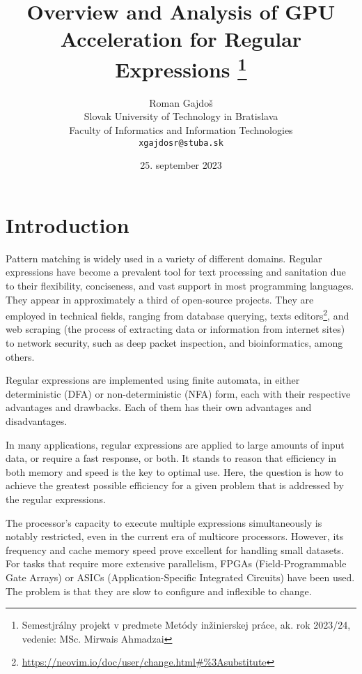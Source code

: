 \documentclass[10pt,onecolumn,twoside,english,a4paper]{article}
\title{Overview and Analysis of GPU Acceleration for Regular Expressions
\thanks{Semestjrálny projekt v predmete Metódy inžinierskej práce, ak. rok 2023/24, vedenie: MSc. Mirwais Ahmadzai}} %
\author{Roman Gajdoš\\[2pt]
	{\small Slovak University of Technology in Bratislava}\\
	{\small Faculty of Informatics and Information Technologies}\\
	{\small \texttt{xgajdosr@stuba.sk}}
	}
\date{\small 25. september 2023} %
\begin{document}
\maketitle

\begin{abstract}
	\blindtext[2]

\end{abstract}

\section{Introduction} \label{Introduction}
Pattern matching is widely used in a variety of different domains. Regular expressions have become a prevalent tool for text processing and sanitation due to their flexibility, conciseness, and vast support in most programming languages\cite{Chapman:Usage}. They appear in approximately a third of open-source projects\cite{Davis:Re-use}. They are employed in technical fields, ranging from database querying\cite{István:databases-regex}, texts editors\footnote{\url{https://neovim.io/doc/user/change.html\#\%3Asubstitute}}, and web scraping (the process of extracting data or information from internet sites)\cite{Gunawan2019/03} to network security, such as deep packet inspection\cite{becchi2008workload}, and bioinformatics\cite{prieto2014prediction}, among others.

Regular expressions are implemented using finite automata, in either deterministic (DFA) or non-deterministic (NFA) form, each with their respective advantages and drawbacks. Each of them has their own advantages and disadvantages\cite{Becchi:regex_large_dataset,Nourian:DemystifyingFSA,Zu:GPU-NFA}.

In many applications, regular expressions are applied to large amounts of input data, or require a fast response, or both. It stands to reason that efficiency in both memory and speed is the key to optimal use\cite{Xia:FSA-scaling}.
Here, the question is how to achieve the greatest possible efficiency for a given problem that is addressed by the regular expressions.

The processor's capacity to execute multiple expressions simultaneously is notably restricted, even in the current era of multicore processors\cite{Lee:myths}. However, its frequency and cache memory speed prove excellent for handling small datasets. For tasks that require more extensive parallelism, FPGAs (Field-Programmable Gate Arrays) or ASICs (Application-Specific Integrated Circuits) have been used. The problem is that they are slow to configure\cite{XU:regex_alg_slow} and inflexible to change\cite{fuchs2019accelerator,Liu:Asynchronous}.
\end{document}
